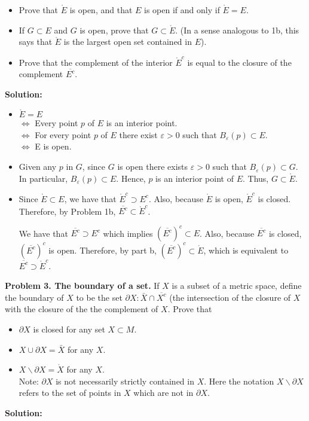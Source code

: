 \documentclass[12pt]{article}
\def\black{\color{black}}
\def\green{\color{rltgreen}}
\newcommand\bi{\begin{itemize}}
\newcommand\ei{\end{itemize}}
\newcommand\itema{\item[(a)]}
\newcommand\itemb{\item[(b)]}
\newcommand\itemc{\item[(c)]}
\renewcommand\|{\ | \ }
\def\pb#1{{\green \bf Problem #1.}\hskip 8pt \black}
\def\sol{\textbf{Solution:}}
\newcommand\e\varepsilon
\begin{document}
\bi
\itema
Prove that $\mathring E$ is open, and that $E$ is open if and only if
$\mathring E = E$.
\itemb
If $G \subset E$ and $G$ is open, prove that $G \subset \mathring E$.
(In a sense analogous to 1b, this says that $\mathring E$ is the largest
open set contained in $E$).
\itemc
Prove that the complement of the interior $\mathring E^c$ is equal to the
closure of the complement $\overline{E^c}$.
\ei

\sol

\bi
\itema
$\mathring E = E$ \\
$\Leftrightarrow$ Every point $p$ of $E$ is an interior point. \\
$\Leftrightarrow$ For every point $p$ of $E$ there exist $\e > 0$ such
that $B_{\e}(p) \subset E$. \\
$\Leftrightarrow$ E is open.
\itemb
Given any $p$ in $G$, since $G$ is open there exists $\e > 0$ such
that $B_{\e}(p) \subset G$. In particular, $B_{\e}(p) \subset E$.
Hence, $p$ is an interior point of $E$. Thus, $G \subset \mathring E$.
\itemc
Since $\mathring E \subset E$, we have that $\mathring E^c \supset E^c$.
Also, because $\mathring E$ is open, $\mathring E^c$ is closed. Therefore,
by Problem 1b, $\overline{E^c} \subset \mathring E^c$.

We have that $\overline{E^c} \supset E^c$ which
implies $(\overline{E^c})^c \subset E$.
Also, because $\overline{E^c}$ is closed, $(\overline{E^c})^c$ is open.
Therefore, by part b, $(\overline{E^c})^c \subset \mathring E$, which
is equivalent to $\overline{E^c} \supset \mathring E^c$.
\ei



\pb{3. The boundary of a set}
If $X$ is a subset of a metric space, define the boundary of $X$ to be the
set $\partial X : \bar X \cap \overline{X^c}$ (the intersection of the 
closure of $X$ with the closure of the the complement of $X$. Prove that

\bi
\itema
$\partial X$ is closed for any set $X \subset M$.
\itemb
$X \cup \partial X = \bar X$ for any $X$.
\itemc
$X \backslash \partial X = \mathring X$ for any $X$.\\
Note: $\partial X$ is not necessarily strictly contained in $X$. Here
the notation $X \backslash \partial X$ refers to the set of points in
$X$ which are not in $\partial X$.
\ei

\sol
\end{document}
